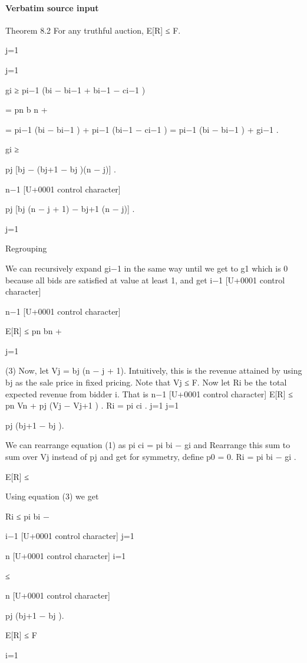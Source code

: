 \documentclass[10pt]{article}
\begin{document}
\paragraph{Verbatim source input}
\begin{ReviewVerbatim}
Theorem 8.2 For any truthful auction, E[R] ≤ F.

j=1

j=1

gi ≥ pi−1 (bi − bi−1 + bi−1 − ci−1 )

= pn b n +

= pi−1 (bi − bi−1 ) + pi−1 (bi−1 − ci−1 )
= pi−1 (bi − bi−1 ) + gi−1 .

gi ≥

pj [bj − (bj+1 − bj )(n − j)] .

n−1
[U+0001 control character]

pj [bj (n − j + 1) − bj+1 (n − j)] .

j=1

Regrouping

We can recursively expand gi−1 in the same way until
we get to g1 which is 0 because all bids are satisfied
at value at least 1, and get
i−1
[U+0001 control character]

n−1
[U+0001 control character]

E[R] ≤ pn bn +

j=1

(3) Now, let Vj = bj (n − j + 1). Intuitively, this is the
revenue attained by using bj as the sale price in fixed
pricing. Note that Vj ≤ F.
Now let Ri be the total expected revenue from bidder i. That is
n−1
[U+0001 control character]
E[R] ≤ pn Vn +
pj (Vj − Vj+1 ) .
Ri = pi ci .
j=1
j=1

pj (bj+1 − bj ).

We can rearrange equation (1) as pi ci = pi bi − gi and Rearrange this sum to sum over Vj instead of pj and
get
for symmetry, define p0 = 0.
Ri = pi bi − gi .

E[R] ≤

Using equation (3) we get

Ri ≤ pi bi −

i−1
[U+0001 control character]
j=1

n
[U+0001 control character]
i=1

≤

n
[U+0001 control character]

pj (bj+1 − bj ).

E[R] ≤ F

i=1


\end{ReviewVerbatim}
\end{document}
